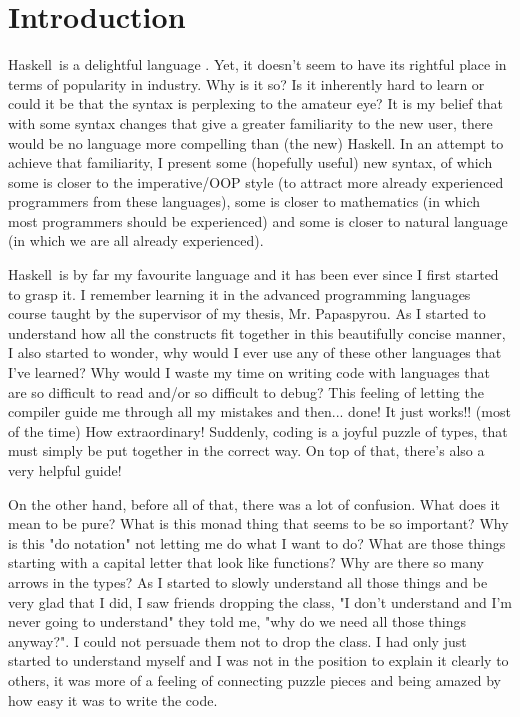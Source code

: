 \documentclass[diploma]{softlab-thesis}
\def\H{Haskell}
\begin{document}
\englishtext

\chapter{Introduction}

\H\ is a delightful language \cite{marlow2010haskell}.
Yet, it doesn't seem to have its rightful place
in terms of popularity in industry. Why is it so?  Is it inherently hard to
learn or could it be that the syntax is perplexing to the amateur eye? It is
my belief that with some syntax changes that give a greater familiarity to the
new user, there would be no language more compelling than (the new) \H. In an
attempt to achieve that familiarity, I present some (hopefully useful) new
syntax, of which some is closer to the imperative/OOP style (to attract more
already experienced programmers from these languages), some is closer to
mathematics (in which most programmers should be experienced) and some is
closer to natural language (in which we are all already experienced).

\H\ is by far my favourite language and it has been ever since I first started
to grasp it. I remember learning it in the advanced programming languages
course taught by the supervisor of my thesis, Mr. Papaspyrou. As I started
to understand how all the constructs fit together in this beautifully concise
manner, I also started to wonder, why would I ever use any of these other
languages that I've learned? Why would I waste my time on writing code
with languages that are so difficult to read and/or so difficult to debug?
This feeling of letting the compiler guide me through all my mistakes and
then... done! It just works!! (most of the time) How extraordinary! Suddenly,
coding is a joyful puzzle of types, that must simply be put together
in the correct way. On top of that, there's also a very helpful guide!

On the other hand, before all of that, there was a lot of confusion. What does
it mean to be pure? What is this monad thing that seems to be so important?
Why is this "do notation" not letting me do what I want to do? What are those
things starting with a capital letter that look like functions? Why are there
so many arrows in the types? As I started to slowly understand all those things
and be very glad that I did, I saw friends dropping the class, "I don't
understand and I'm never going to understand" they told me, "why do we need all
those things anyway?". I could not persuade them not to drop the class. I had
only just started to understand myself and I was not in the position to explain
it clearly to others, it was more of a feeling of connecting puzzle pieces and
being amazed by how easy it was to write the code.
\end{document}
